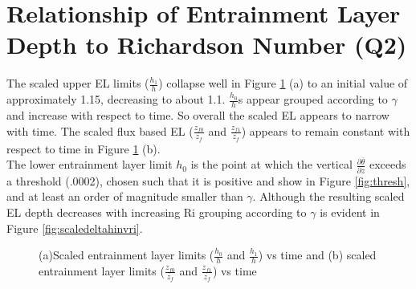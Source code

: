 \clearpage



\section{Relationship of Entrainment Layer Depth to Richardson Number (Q2)}
\label{sec:deltahri}
\FloatBarrier

The scaled upper EL limits ($\frac{h_{1}}{h}$) collapse well in Figure \ref{fig:scaledELlims} (a) 
to an initial value of approximately 1.15, decreasing to about 1.1.  $\frac{h_{0}}{h}$s appear 
grouped according to $\gamma$ and increase with respect to time.  So overall the scaled \acs{EL} appears
to narrow with time.   The scaled flux based \acs{EL} ($\frac{z_{f0}}{z_{f}}$ and $\frac{z_{f1}}{z_{f}}$) appears to remain constant 
with respect to time in Figure \ref{fig:scaledELlims} (b).\\

The lower entrainment layer limit $h_{0}$ is the point at which the vertical 
$\frac{\partial \overline{\theta}}{\partial z}$ exceeds a threshold (.0002), chosen such that
it is positive and show in Figure \ref{fig:thresh}, and at least an order of magnitude smaller than $\gamma$.   
Although the resulting scaled \acs{EL} depth decreases with increasing \acs{Ri} grouping according to $\gamma$ is evident 
in Figure \ref{fig:scaledeltahinvri}.\\


\begin{figure}[htbp]
\begin{minipage}[b]{0.5\linewidth}
 
        \end{minipage}             
\quad
\begin{minipage}[b]{0.5\linewidth}
       \end{minipage}
        \caption[Scaled \acs{EL} limits]{(a)Scaled entrainment layer limits ($\frac{h_{0}}{h}$ and $\frac{h_{1}}{h}$) vs time and (b) scaled entrainment layer limits ($\frac{z_{f0}}{z_{f}}$ and $\frac{z_{f1}}{z_{f}}$) vs time}
        \label{fig:scaledELlims}
\end{figure}


